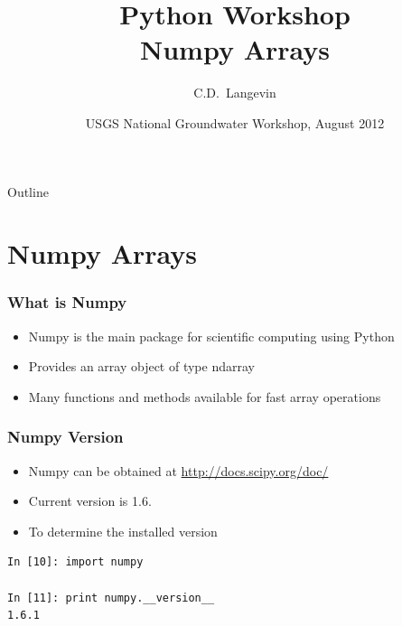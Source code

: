 \documentclass{beamer}
\title[]{Python Workshop\\
Numpy Arrays}
\author[Langevin] %
{C.D.~Langevin}
\institute[USGS] %
{
  U.S. Geological Survey\\
  Reston, Virginia, USA
  }
\date[UQ12] %
{USGS National Groundwater Workshop, August 2012}
\begin{document}
\begin{frame}
  \titlepage
\end{frame}


\begin{frame}{Outline}
\tableofcontents
\end{frame}

\section{Numpy Arrays}
\begin{frame}[fragile]
\frametitle{What is Numpy}
\begin{itemize}
  \item Numpy is the main package for scientific computing using Python
  \item Provides an array object of type ndarray
  \item Many functions and methods available for fast array operations
\end{itemize}
\end{frame}

\begin{frame}[fragile]
\frametitle{Numpy Version}
\begin{itemize}
  \item Numpy can be obtained at \url{http://docs.scipy.org/doc/}
  \item Current version is 1.6.
  \item To determine the installed version
\end{itemize}
  \begin{lstlisting}
In [10]: import numpy

In [11]: print numpy.__version__
1.6.1
  \end{lstlisting}
\end{frame}
\end{document}
